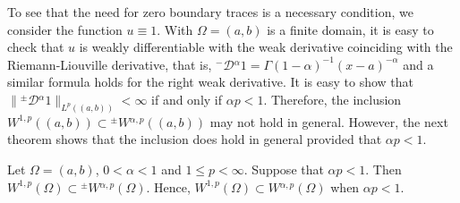 \documentclass[leqno,final]{siamltex}
\numberwithin{equation}{section}
\renewcommand{\(}{\bigl(}
\renewcommand{\)}{\bigr)}
\begin{document}
        To see that the need for zero boundary traces is a necessary condition, we consider  the function 
        $u \equiv 1$. With $\Omega = (a,b)$ is a finite domain, it is easy to check that $u$ is weakly differentiable with 
        the weak derivative coinciding with the Riemann-Liouville derivative, that is,  ${^{-}}{\mathcal{D}}{^{\alpha}} 1 = \Gamma(1-\alpha)^{-1} (x-a)^{-\alpha}$ 
        and a similar formula holds for the right weak derivative. It is easy to show that $\|{^{\pm}}{\mathcal{D}}{^{\alpha}} 1 \|_{L^{p}((a,b))} < \infty$ if and only if $\alpha p <1$. 
        Therefore, the inclusion $W^{1,p}((a,b)) \subset {^{\pm}}{W}{^{\alpha,p}}((a,b))$ may not 
        hold in general. However, the next theorem shows that the inclusion does hold in general
        provided that $\alpha p <1$. 
          
        \begin{theorem}
           Let $\Omega =(a,b)$, $0 <\alpha<1$ and $1\leq p<\infty$. Suppose that $\alpha p <1$. Then $W^{1,p}(\Omega) \subset {^{\pm}}{W}{^{\alpha,p}}(\Omega)$. Hence, $W^{1,p}(\Omega) \subset   {W}{^{\alpha,p}}(\Omega)$ when $\alpha p <1$.
        \end{theorem}
        
\end{document}
